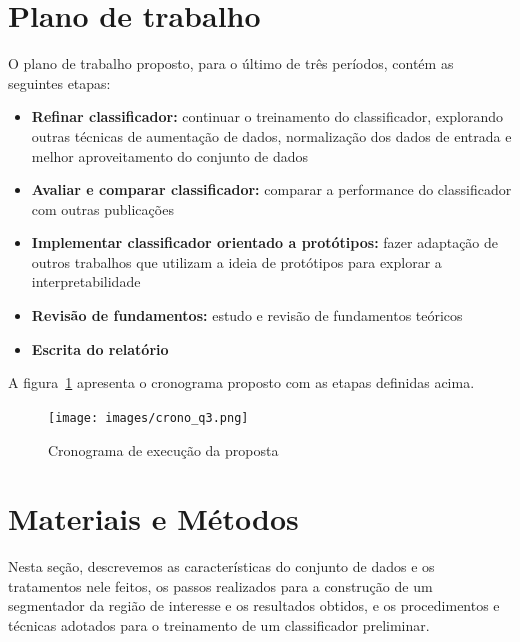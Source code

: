\documentclass[12pt]{article}
\begin{document}
\bigskip

\section{Plano de trabalho}
\label{sec:schedule}

O plano de trabalho proposto, para o último de três períodos, contém as seguintes etapas:
\begin{itemize}
    \item \textbf{Refinar classificador:} continuar o treinamento do classificador, explorando outras técnicas de aumentação de dados, normalização dos dados de entrada e melhor aproveitamento do conjunto de dados
    \item \textbf{Avaliar e comparar classificador:} comparar a performance do classificador com outras publicações
    \item \textbf{Implementar classificador orientado a protótipos:} fazer adaptação de outros trabalhos que utilizam a ideia de protótipos para explorar a interpretabilidade
    \item \textbf{Revisão de fundamentos:} estudo e revisão de fundamentos teóricos
    \item \textbf{Escrita do relatório}
\end{itemize}

A figura~\ref{fig:crono} apresenta o cronograma proposto com as etapas definidas acima.

\begin{figure}[htb]
 \centering
 \texttt{[image: images/crono\_q3.png]}
 \caption{Cronograma de execução da proposta}
 \label{fig:crono}
\end{figure}

\bigskip

\section{Materiais e Métodos}
\label{sec:methodology}

Nesta seção, descrevemos as características do conjunto de dados e os tratamentos nele feitos, os passos realizados para a construção de um segmentador da região de interesse e os resultados obtidos, e os procedimentos e técnicas adotados para o treinamento de um classificador preliminar.
\end{document}
